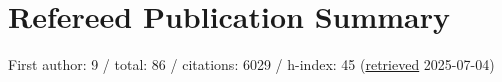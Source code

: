 \section*{Refereed Publication Summary}

First author: 9 / total: 86 / citations: 6029 / h-index: 45 (\href{https://ui.adsabs.harvard.edu/#/public-libraries/G0Ow9TGTRyuVT7hbhzailA}{retrieved} 2025-07-04)
